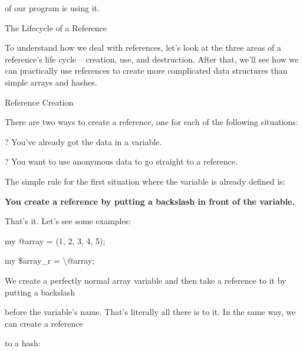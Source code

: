 \documentclass[a4paper,11pt]{book}
\begin{document}
\noindent of our program is using it.

\noindent 

\noindent 

\noindent The Lifecycle of a Reference

\noindent 

\noindent To understand how we deal with references, let's look at the three areas of a reference's life cycle -- creation, use, and destruction. After that, we'll see how we can practically use references to create more complicated data structures than simple arrays and hashes.

\noindent 

\noindent Reference Creation

\noindent 

\noindent There are two ways to create a reference, one for each of the following situations:

\noindent 

\noindent ? You've already got the data in a variable.

\noindent 

\noindent ? You want to use anonymous data to go straight to a reference.

\noindent 

\noindent 

\noindent The simple rule for the first situation where the variable is already defined is:

\noindent 

\noindent 

\noindent \textbf{You create a reference by putting a backslash in front of the variable.}

\noindent 

\noindent 

\noindent That's it. Let's see some examples:

\noindent 

\noindent 

\noindent my @array = (1, 2, 3, 4, 5);

\noindent my \$array\_r = \textbackslash @array;

\noindent 

\noindent We create a perfectly normal array variable and then take a reference to it by putting a backslash

\noindent before the variable's name. That's literally all there is to it. In the same way, we can create a reference

\noindent to a hash:
\end{document}

